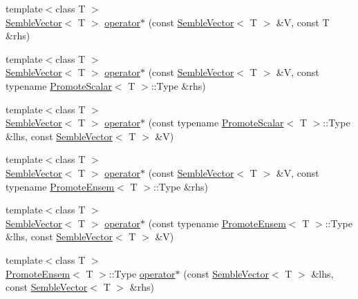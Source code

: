 \begin{DoxyCompactItemize}
\item 
{\footnotesize template$<$class T $>$ }\\\mbox{\hyperlink{structSEMBLE_1_1SembleVector}{Semble\+Vector}}$<$ T $>$ \mbox{\hyperlink{namespaceSEMBLE_a5a26d8f528ca309be35f6d92029bdab1}{operator$\ast$}} (const \mbox{\hyperlink{structSEMBLE_1_1SembleVector}{Semble\+Vector}}$<$ T $>$ \&V, const T \&rhs)
\item 
{\footnotesize template$<$class T $>$ }\\\mbox{\hyperlink{structSEMBLE_1_1SembleVector}{Semble\+Vector}}$<$ T $>$ \mbox{\hyperlink{namespaceSEMBLE_adf8fefd101f5699d4a49b90d3f8b46c4}{operator$\ast$}} (const \mbox{\hyperlink{structSEMBLE_1_1SembleVector}{Semble\+Vector}}$<$ T $>$ \&V, const typename \mbox{\hyperlink{structSEMBLE_1_1PromoteScalar}{Promote\+Scalar}}$<$ T $>$\+::Type \&rhs)
\item 
{\footnotesize template$<$class T $>$ }\\\mbox{\hyperlink{structSEMBLE_1_1SembleVector}{Semble\+Vector}}$<$ T $>$ \mbox{\hyperlink{namespaceSEMBLE_a816be7bea618689cc476ee8bea59c149}{operator$\ast$}} (const typename \mbox{\hyperlink{structSEMBLE_1_1PromoteScalar}{Promote\+Scalar}}$<$ T $>$\+::Type \&lhs, const \mbox{\hyperlink{structSEMBLE_1_1SembleVector}{Semble\+Vector}}$<$ T $>$ \&V)
\item 
{\footnotesize template$<$class T $>$ }\\\mbox{\hyperlink{structSEMBLE_1_1SembleVector}{Semble\+Vector}}$<$ T $>$ \mbox{\hyperlink{namespaceSEMBLE_a2013893de76572174b6ed2c5bf85f639}{operator$\ast$}} (const \mbox{\hyperlink{structSEMBLE_1_1SembleVector}{Semble\+Vector}}$<$ T $>$ \&V, const typename \mbox{\hyperlink{structSEMBLE_1_1PromoteEnsem}{Promote\+Ensem}}$<$ T $>$\+::Type \&rhs)
\item 
{\footnotesize template$<$class T $>$ }\\\mbox{\hyperlink{structSEMBLE_1_1SembleVector}{Semble\+Vector}}$<$ T $>$ \mbox{\hyperlink{namespaceSEMBLE_a87b964977248d89a4706463afcd376eb}{operator$\ast$}} (const typename \mbox{\hyperlink{structSEMBLE_1_1PromoteEnsem}{Promote\+Ensem}}$<$ T $>$\+::Type \&lhs, const \mbox{\hyperlink{structSEMBLE_1_1SembleVector}{Semble\+Vector}}$<$ T $>$ \&V)
\item 
{\footnotesize template$<$class T $>$ }\\\mbox{\hyperlink{structSEMBLE_1_1PromoteEnsem}{Promote\+Ensem}}$<$ T $>$\+::Type \mbox{\hyperlink{namespaceSEMBLE_a24f6d394103eca5835deaad4873c1f7b}{operator$\ast$}} (const \mbox{\hyperlink{structSEMBLE_1_1SembleVector}{Semble\+Vector}}$<$ T $>$ \&lhs, const \mbox{\hyperlink{structSEMBLE_1_1SembleVector}{Semble\+Vector}}$<$ T $>$ \&rhs)

\end{DoxyCompactItemize}
